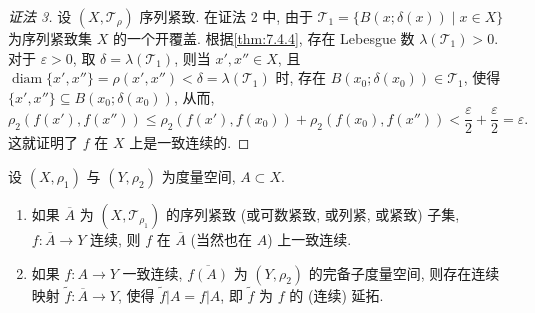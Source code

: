 \begin{proof}[证法 3]
设 $(X, \mathcal{T}_{\rho})$ 序列紧致. 在证法 2 中, 由于 $\mathcal{T}_{1} = \{B(x; \delta(x)) \mid x \in X\}$ 为序列紧致集 $X$ 的一个开覆盖. 根据\cref{thm:7.4.4}, 存在 Lebesgue 数 $\lambda(\mathcal{T}_{1}) > 0$. 对于 $\varepsilon > 0$, 取 $\delta = \lambda(\mathcal{T}_{1})$, 则当 $x', x'' \in X$, 且 $\operatorname{diam}\{x', x''\} = \rho(x', x'') < \delta = \lambda(\mathcal{T}_{1})$ 时, 存在 $B(x_{0}; \delta(x_{0})) \in \mathcal{T}_{1}$, 使得 $\{x', x''\} \subseteq B(x_{0}; \delta(x_{0}))$, 从而,
\[
  \rho_{2}\left(f(x'), f(x'')\right) \leqslant \rho_{2}\left(f(x'), f(x_{0})\right) + \rho_{2}\left(f(x_{0}), f(x'')\right) < \frac{\varepsilon}{2} + \frac{\varepsilon}{2} = \varepsilon.
\]
这就证明了 $f$ 在 $X$ 上是一致连续的.
\end{proof}

\begin{theorem}[延拓定理]\label{thm:7.4.6}
设 $(X, \rho_{1})$ 与 $(Y, \rho_{2})$ 为度量空间, $A \subset X$.
\begin{enumerate}
  \item 如果 $\overline{A}$ 为 $(X, \mathcal{T}_{\rho_{1}})$ 的序列紧致 (或可数紧致, 或列紧, 或紧致) 子集, $f\colon \overline{A} \to Y$ 连续, 则 $f$ 在 $\overline{A}$ (当然也在 $A$) 上一致连续.

  \item 如果 $f\colon A \to Y$ 一致连续, $\overline{f(A)}$ 为 $(Y, \rho_{2})$ 的完备子度量空间, 则存在连续映射 $\tilde{f}\colon \overline{A} \to Y$, 使得 $\tilde{f}|A = f|A$, 即 $\tilde{f}$ 为 $f$ 的 (连续) 延拓.
\end{enumerate}
\end{theorem}

